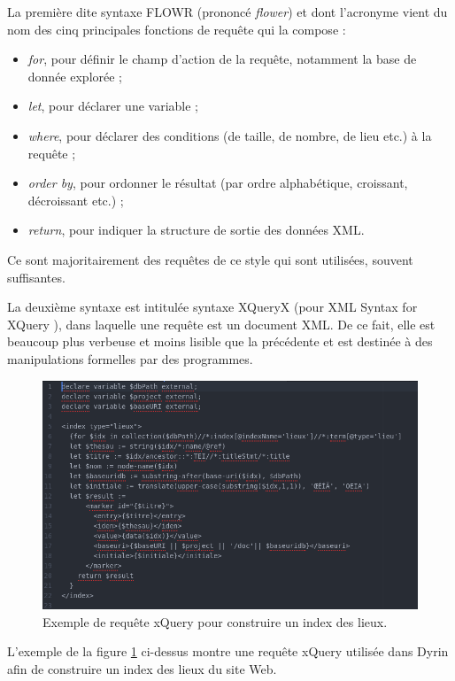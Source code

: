 \documentclass[a4paper,12pt,twoside]{book}
\begin{document}
    La première dite syntaxe \og FLOWR \fg{} (prononcé \textit{flower}) et dont l'acronyme vient du nom des cinq principales fonctions de requête qui la compose :
        \begin{itemize}
            \item \textit{for}, pour définir le champ d'action de la requête, notamment la base de donnée explorée ;
            \item \textit{let}, pour déclarer une variable ;
            \item \textit{where}, pour déclarer des conditions (de taille, de nombre, de lieu etc.) à la requête ;
            \item \textit{order by}, pour ordonner le résultat (par ordre alphabétique, croissant, décroissant etc.) ;
            \item \textit{return}, pour indiquer la structure de sortie des données XML.
            \end{itemize}
Ce sont majoritairement des requêtes de ce style qui sont utilisées, souvent suffisantes.

La deuxième syntaxe est intitulée syntaxe XQueryX (pour \og XML Syntax for XQuery \fg), dans laquelle une requête est un document XML. De ce fait, elle est beaucoup plus verbeuse et moins lisible que la précédente et est destinée à des manipulations formelles par des programmes.


\begin{figure}[H]
    \centering
    \includegraphics[width=12cm]{img/autre/xquery_exemple.png}
    \caption{Exemple de requête xQuery pour construire un index des lieux.}
    \label{xq}
\end{figure}

    L'exemple de la figure \ref{xq} ci-dessus montre une requête xQuery utilisée dans Dyrin afin de construire un index des lieux du site Web.
    
\end{document}
